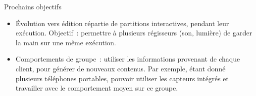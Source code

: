 \begin{block}{Prochains objectifs}
	\begin{itemize}
		\item Évolution vers édition répartie de partitions interactives, pendant leur exécution. Objectif~: permettre à plusieurs régisseurs (son, lumière) de garder la main sur une même exécution.
		\item Comportements de groupe~: utiliser les informations provenant de chaque client, pour générer de nouveaux contenus. Par exemple, étant donné plusieurs téléphones portables, pouvoir utiliser les capteurs intégrés et travailler avec le comportement moyen sur ce groupe.
	\end{itemize}
\end{block}